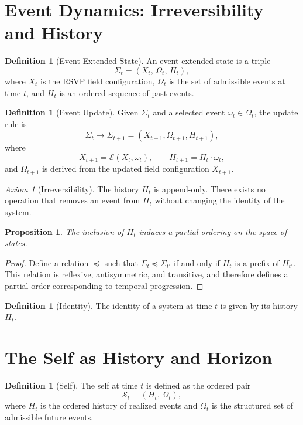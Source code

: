 \documentclass[11pt,a4paper]{article}
\newtheorem{proposition}[theorem]{Proposition}
\theoremstyle{definition}
\newtheorem{definition}[theorem]{Definition}
\theoremstyle{remark}
\newtheorem{axiom}[theorem]{Axiom}
\begin{document}
\section{Event Dynamics: Irreversibility and History}

\begin{definition}[Event-Extended State]
An event-extended state is a triple
\[
\Sigma_t = (X_t,\, \Omega_t,\, H_t),
\]
where $X_t$ is the RSVP field configuration, $\Omega_t$ is the set of admissible events at time $t$, and $H_t$ is an ordered sequence of past events.
\end{definition}

\begin{definition}[Event Update]
Given $\Sigma_t$ and a selected event $\omega_t \in \Omega_t$, the update rule is
\[
\Sigma_t \rightarrow \Sigma_{t+1} = (X_{t+1}, \Omega_{t+1}, H_{t+1}),
\]
where
\[
X_{t+1} = \mathcal{E}(X_t, \omega_t), \qquad H_{t+1} = H_t \cdot \omega_t,
\]
and $\Omega_{t+1}$ is derived from the updated field configuration $X_{t+1}$.
\end{definition}

\begin{axiom}[Irreversibility]
The history $H_t$ is append-only. There exists no operation that removes an event from $H_t$ without changing the identity of the system.
\end{axiom}

\begin{proposition}
The inclusion of $H_t$ induces a partial ordering on the space of states.
\end{proposition}

\begin{proof}
Define a relation $\preceq$ such that $\Sigma_t \preceq \Sigma_{t'}$ if and only if $H_t$ is a prefix of $H_{t'}$. This relation is reflexive, antisymmetric, and transitive, and therefore defines a partial order corresponding to temporal progression.
\end{proof}

\begin{definition}[Identity]
The identity of a system at time $t$ is given by its history $H_t$.
\end{definition}

\section{The Self as History and Horizon}

\begin{definition}[Self]
The self at time $t$ is defined as the ordered pair
\[
\mathcal{S}_t = (H_t,\, \Omega_t),
\]
where $H_t$ is the ordered history of realized events and $\Omega_t$ is the structured set of admissible future events.
\end{definition}
\end{document}
